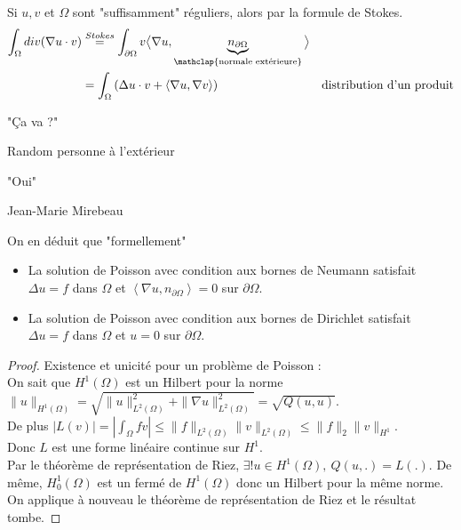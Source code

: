 \begin{remarque}
    Si $u,v$ et $\Omega$ sont "suffisamment" réguliers, alors par la formule de Stokes.\\
    \begin{align*}
        \int_\Omega div(\nabla u\cdot v)&\overset{Stokes}{=}\int_{\partial \Omega}v\big<\nabla u, \underbrace{n_{\partial \Omega}}_{\mathclap{\text{normale extérieure}}} \big>\\
                                        &=\int_\Omega \left( \Delta u\cdot v+\left<\nabla u,\nabla v \right> \right) &\text{distribution d'un produit}
    \end{align*}
    
    \epigraph{"Ça va ?"}{Random personne à l'extérieur}
    \epigraph{"Oui"}{Jean-Marie Mirebeau}
    On en déduit que "formellement"
    \begin{itemize}
        \item La solution de Poisson avec condition aux bornes de Neumann satisfait $\Delta u=f$ dans $\Omega$ et $\left<\nabla u,n_{\partial \Omega} \right> = 0$ sur $\partial \Omega.$
        \item La solution de Poisson avec condition aux bornes de Dirichlet satisfait $\Delta u=f$ dans $\Omega$ et $u=0$ sur $\partial \Omega.$
    \end{itemize}
\end{remarque}
\begin{proof}
    Existence et unicité pour un problème de Poisson :\\
    On sait que $H^1(\Omega)$ est un Hilbert pour la norme \\
    $\|u\|_{H^1(\Omega)}=\sqrt{\|u\|_{L^2(\Omega)}^2+\|\nabla u\|_{L^2(\Omega)}^2}=\sqrt{Q(u,u)}.$ \\
    De plus $|L(v)| =|\int_\Omega fv| \le \|f\|_{L^2(\Omega)}\|v\|_{L^2(\Omega)}\le \|f\|_2\|v\|_{H^1}.$ \\
    Donc $L$ est une forme linéaire continue sur $H^1.$ \\
    Par le théorème de représentation de Riez, $\exists !u\in H^1(\Omega),\ Q(u,.)=L(.).$ De même, $H_0^1(\Omega)$ est un fermé de $H^1(\Omega)$ donc un Hilbert pour la même norme. On applique à nouveau le théorème de représentation de Riez et le résultat tombe.
\end{proof}

